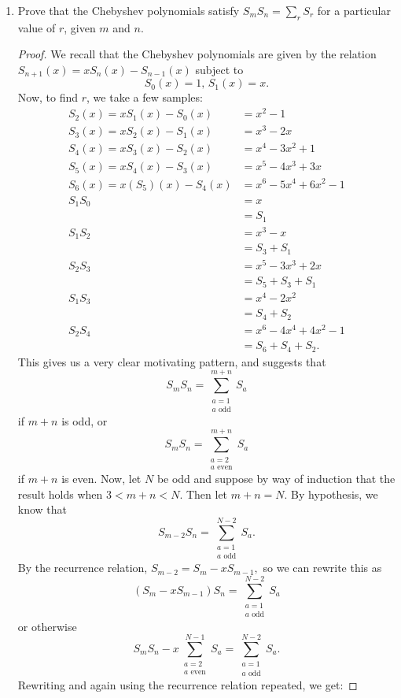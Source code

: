 \documentclass{article}
\begin{document}
\begin{enumerate}
    \item Prove that the Chebyshev polynomials satisfy $S_mS_n = \sum_{r} S_r$ for a particular value of $r$, given $m$ and $n.$
    \begin{proof}
      We recall that the Chebyshev polynomials are given by the relation $S_{n+1}(x) = xS_n(x) -S_{n-1}(x) $ subject to \[S_0(x) = 1,\, S_1(x) = x.\]
      Now, to find $r$, we take a few samples:
      \begin{align*}
        S_2(x) = xS_1(x)-S_0(x) & = x^2-1\\
        S_3(x) = xS_2(x)-S_1(x) &= x^3-2x\\
        S_4(x) = xS_3(x) -S_2(x) &= x^4-3x^2+1\\
        S_5(x) = xS_4(x) - S_3(x) &= x^5-4x^3+3x\\
        S_6(x) = x(S_5)(x) - S_4(x) &= x^6-5x^4+6x^2-1\\
        S_1S_0 &= x\\
        &= S_1\\
        S_1S_2 &= x^3-x\\
        &= S_3+S_1\\
        S_2S_3 &= x^5-3x^3+2x\\
        &= S_5 + S_3  + S_1\\
        S_1S_3 &= x^4-2x^2\\
        &= S_4 + S_2\\
        S_2S_4 &= x^6-4x^4+4x^2-1\\
        &=S_6 + S_4 + S_2.
      \end{align*}
      This gives us a very clear motivating pattern, and suggests that \[S_mS_n = \sum_{\substack{a=1\\a \text{ odd}}}^{m+n} S_a\] if $m+n$ is odd, or \[S_mS_n = \sum_{\substack{a=2\\a \text{ even}}}^{m+n} S_a\] if $m+n$ is even.
      Now, let $N$ be odd and suppose by way of induction that the result holds when $3<m+n<N$. Then let $m+n = N.$ By hypothesis, we know that \[S_{m-2}S_n = \displaystyle\sum_{\substack{a=1\\a \text{ odd}}}^{N-2}S_a.\] By the recurrence relation, $S_{m-2} = S_{m}-xS_{m-1},$ so we can rewrite this as \[(S_m -xS_{m-1})S_n = \sum_{\substack{a=1\\a \text{ odd}}}^{N-2}S_a\]
      or otherwise \[S_mS_n -x\sum_{\substack{a=2\\a \text{ even}}}^{N-1} S_a = \sum_{\substack{a=1\\a \text{ odd}}}^{N-2}S_a.\] Rewriting and again using the recurrence relation repeated, we get:

\end{proof}
\end{enumerate}
\end{document}
